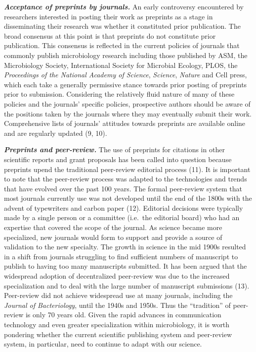 \documentclass[11pt,]{article}
\begin{document}
\textbf{\emph{Acceptance of preprints by journals.}} An early
controversy encountered by researchers interested in posting their work
as preprints as a stage in disseminating their research was whether it
constituted prior publication. The broad consensus at this point is that
preprints do not constitute prior publication. This consensus is
reflected in the current policies of journals that commonly publish
microbiology research including those published by ASM, the Microbiology
Society, International Society for Microbial Ecology, PLOS, the
\emph{Proceedings of the National Academy of Science}, \emph{Science},
\emph{Nature} and Cell press, which each take a generally permissive
stance towards prior posting of preprints prior to submission.
Considering the relatively fluid nature of many of these policies and
the journals' specific policies, prospective authors should be aware of
the positions taken by the journals where they may eventually submit
their work. Comprehensive lists of journals' attitudes towards preprints
are available online and are regularly updated (9, 10).

\textbf{\emph{Preprints and peer-review.}} The use of preprints for
citations in other scientific reports and grant proposals has been
called into question because preprints upend the traditional peer-review
editorial process (11). It is important to note that the peer-review
process was adapted to the technologies and trends that have evolved
over the past 100 years. The formal peer-review system that most
journals currently use was not developed until the end of the 1800s with
the advent of typewriters and carbon paper (12). Editorial decisions
were typically made by a single person or a committee (i.e.~the
editorial board) who had an expertise that covered the scope of the
journal. As science became more specialized, new journals would form to
support and provide a source of validation to the new specialty. The
growth in science in the mid 1900s resulted in a shift from journals
struggling to find sufficient numbers of manuscript to publish to having
too many manuscripts submitted. It has been argued that the widespread
adoption of decentralized peer-review was due to the increased
specialization and to deal with the large number of manuscript
submissions (13). Peer-review did not achieve widespread use at many
journals, including the \emph{Journal of Bacteriology}, until the 1940s
and 1950s. Thus the ``tradition'' of peer-review is only 70 years old.
Given the rapid advances in communication technology and even greater
specialization within microbiology, it is worth pondering whether the
current scientific publishing system and peer-review system, in
particular, need to continue to adapt with our science.
\end{document}
